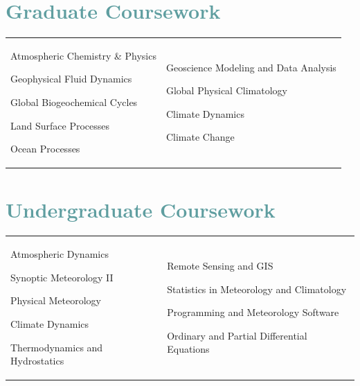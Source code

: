 \documentclass[margin,line,palatino,courier,10pt]{res}
\newenvironment{list1}{
  \begin{list}{\ding{113}}{%
      \setlength{\itemsep}{0in}
      \setlength{\parsep}{0in} \setlength{\parskip}{0in}
      \setlength{\topsep}{0in} \setlength{\partopsep}{0in}
      \setlength{\leftmargin}{0.17in}}}{\end{list}}
\begin{document}
\begin{resume}
\section{\sc \textcolor{CadetBlue}{\large{Graduate Coursework}}}

\begin{tabular}{@{}p{2.2in}p{3in}}
\begin{list1}
\item Atmospheric Chemistry \& Physics 
\item Geophysical Fluid Dynamics
\item Global Biogeochemical Cycles
\item Land Surface Processes
\item Ocean Processes
\end{list1}
&
\begin{list1}
\item Geoscience Modeling and Data Analysis
\item Global Physical Climatology
\item Climate Dynamics
\item Climate Change
\end{list1}


\end{tabular}

\newpage
\section{\sc \textcolor{CadetBlue}{\large{Undergraduate Coursework}}}

\begin{tabular}{@{}p{2.2in}p{3in}}
\vspace*{0.04in}
\begin{list1}
\item Atmospheric Dynamics
\item Synoptic Meteorology II
\item Physical Meteorology
\item Climate Dynamics
\item Thermodynamics and Hydrostatics 
\end{list1}
&
\begin{list1}
\item Remote Sensing and GIS
\item Statistics in Meteorology and Climatology
\item Programming and Meteorology Software
\item Ordinary and Partial Differential Equations
\end{list1}


\end{tabular}
\end{resume}
\end{document}
